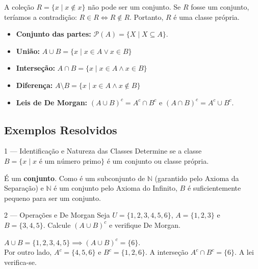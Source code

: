 \begin{thmbox}[title={O Paradoxo de Russell}]
  A coleção $R = \{x \mid x \notin x\}$ não pode ser um conjunto. Se $R$ fosse um conjunto, teríamos a contradição: $R \in R \iff R \notin R$. Portanto, $R$ é uma classe própria.
\end{thmbox}

\begin{defbox}[title={Subconjuntos e Operações}]
  \begin{itemize}
    \item \textbf{Conjunto das partes:} $\mathcal{P}(A) = \{X \mid X \subseteq A\}$.
    \item \textbf{União:} $A \cup B = \{x \mid x \in A \lor x \in B\}$
    \item \textbf{Interseção:} $A \cap B = \{x \mid x \in A \land x \in B\}$
    \item \textbf{Diferença:} $A \setminus B = \{x \mid x \in A \land x \notin B\}$
    \item \textbf{Leis de De Morgan:} $(A \cup B)^c = A^c \cap B^c$ e $(A \cap B)^c = A^c \cup B^c$.
  \end{itemize}
\end{defbox}

\subsection{Exemplos Resolvidos}

\begin{exbox}{1 --- Identificação e Natureza das Classes}
  Determine se a classe $B = \{x \mid x \text{ é um número primo}\}$ é um conjunto ou classe própria.
\end{exbox}
\begin{solbox}
  É um \textbf{conjunto}. Como é um subconjunto de $\mathbb{N}$ (garantido pelo Axioma da Separação) e $\mathbb{N}$ é um conjunto pelo Axioma do Infinito, $B$ é suficientemente pequeno para ser um conjunto.
\end{solbox}

\begin{exbox}{2 --- Operações e De Morgan}
  Seja $U = \{1,2,3,4,5,6\}$, $A = \{1,2,3\}$ e $B = \{3,4,5\}$. Calcule $(A \cup B)^c$ e verifique De Morgan.
\end{exbox}
\begin{solbox}
  $A \cup B = \{1,2,3,4,5\} \implies (A \cup B)^c = \{6\}$. \\
  Por outro lado, $A^c = \{4,5,6\}$ e $B^c = \{1,2,6\}$. A interseção $A^c \cap B^c = \{6\}$. A lei verifica-se. \checkmark
\end{solbox}

